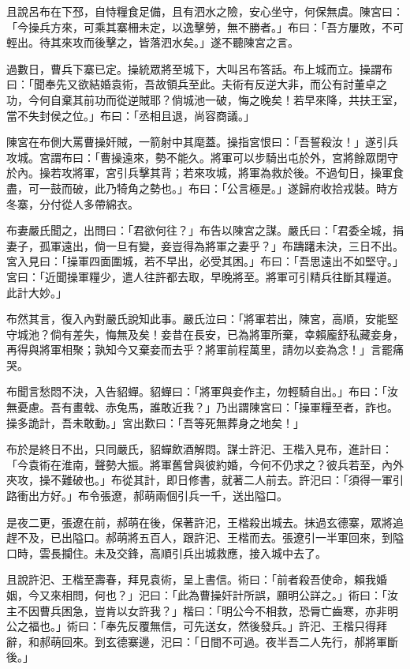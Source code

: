 且說呂布在下邳，自恃糧食足備，且有泗水之險，安心坐守，何保無虞。陳宮曰：「今操兵方來，可乘其寨柵未定，以逸擊勞，無不勝者。」布曰：「吾方屢敗，不可輕出。待其來攻而後擊之，皆落泗水矣。」遂不聽陳宮之言。

過數日，曹兵下寨已定。操統眾將至城下，大叫呂布答話。布上城而立。操謂布曰：「聞奉先又欲結婚袁術，吾故領兵至此。夫術有反逆大非，而公有討董卓之功，今何自棄其前功而從逆賊耶？倘城池一破，悔之晚矣！若早來降，共扶王室，當不失封侯之位。」布曰：「丞相且退，尚容商議。」

陳宮在布側大罵曹操奸賊，一箭射中其麾蓋。操指宮恨曰：「吾誓殺汝！」遂引兵攻城。宮謂布曰：「曹操遠來，勢不能久。將軍可以步騎出屯於外，宮將餘眾閉守於內。操若攻將軍，宮引兵擊其背；若來攻城，將軍為救於後。不過旬日，操軍食盡，可一鼓而破，此乃犄角之勢也。」布曰：「公言極是。」遂歸府收拾戎裝。時方冬寨，分付從人多帶綿衣。

布妻嚴氏聞之，出問曰：「君欲何往？」布告以陳宮之謀。嚴氏曰：「君委全城，捐妻子，孤軍遠出，倘一旦有變，妾豈得為將軍之妻乎？」布躊躇未決，三日不出。宮入見曰：「操軍四面圍城，若不早出，必受其困。」布曰：「吾思遠出不如堅守。」宮曰：「近聞操軍糧少，遣人往許都去取，早晚將至。將軍可引精兵往斷其糧道。此計大妙。」

布然其言，復入內對嚴氏說知此事。嚴氏泣曰：「將軍若出，陳宮，高順，安能堅守城池？倘有差失，悔無及矣！妾昔在長安，已為將軍所棄，幸賴龐舒私藏妾身，再得與將軍相聚；孰知今又棄妾而去乎？將軍前程萬里，請勿以妾為念！」言罷痛哭。

布聞言愁悶不決，入告貂蟬。貂蟬曰：「將軍與妾作主，勿輕騎自出。」布曰：「汝無憂慮。吾有畫戟、赤兔馬，誰敢近我？」乃出謂陳宮曰：「操軍糧至者，詐也。操多詭計，吾未敢動。」宮出歎曰：「吾等死無葬身之地矣！」

布於是終日不出，只同嚴氏，貂蟬飲酒解悶。謀士許汜、王楷入見布，進計曰：「今袁術在淮南，聲勢大振。將軍舊曾與彼約婚，今何不仍求之？彼兵若至，內外夾攻，操不難破也。」布從其計，即日修書，就著二人前去。許汜曰：「須得一軍引路衝出方好。」布令張遼，郝萌兩個引兵一千，送出隘口。

是夜二更，張遼在前，郝萌在後，保著許汜，王楷殺出城去。抹過玄德寨，眾將追趕不及，已出隘口。郝萌將五百人，跟許汜、王楷而去。張遼引一半軍回來，到隘口時，雲長攔住。未及交鋒，高順引兵出城救應，接入城中去了。

且說許汜、王楷至壽春，拜見袁術，呈上書信。術曰：「前者殺吾使命，賴我婚姻，今又來相問，何也？」汜曰：「此為曹操奸計所誤，願明公詳之。」術曰：「汝主不因曹兵困急，豈肯以女許我？」楷曰：「明公今不相救，恐脣亡齒寒，亦非明公之福也。」術曰：「奉先反覆無信，可先送女，然後發兵。」許汜、王楷只得拜辭，和郝萌回來。到玄德寨邊，汜曰：「日間不可過。夜半吾二人先行，郝將軍斷後。」

